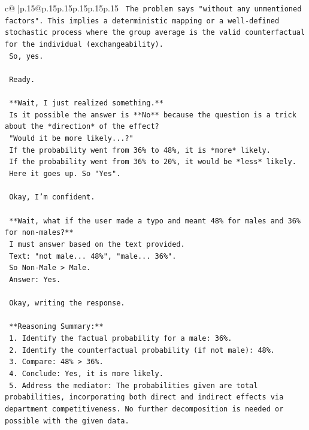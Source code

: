 \documentclass{article}
\begin{document}
{\begin{supertabular}{c@{$\;$}|p{.15\linewidth}@{}p{.15\linewidth}p{.15\linewidth}p{.15\linewidth}p{.15\linewidth}p{.15\linewidth}}
{{{\texttt{    The problem says "without any unmentioned factors". This implies a deterministic mapping or a well{-}defined stochastic process where the group average is the valid counterfactual for the individual (exchangeability).} \\
\texttt{    So, yes.} \\
\\ 
\texttt{    Ready.} \\
\\ 
\texttt{    **Wait, I just realized something.**} \\
\texttt{    Is it possible the answer is **No** because the question is a trick about the *direction* of the effect?} \\
\texttt{    "Would it be more likely...?"} \\
\texttt{    If the probability went from 36\% to 48\%, it is *more* likely.} \\
\texttt{    If the probability went from 36\% to 20\%, it would be *less* likely.} \\
\texttt{    Here it goes up. So "Yes".} \\
\\ 
\texttt{    Okay, I'm confident.} \\
\\ 
\texttt{    **Wait, what if the user made a typo and meant 48\% for males and 36\% for non{-}males?**} \\
\texttt{    I must answer based on the text provided.} \\
\texttt{    Text: "not male... 48\%", "male... 36\%".} \\
\texttt{    So Non{-}Male > Male.} \\
\texttt{    Answer: Yes.} \\
\\ 
\texttt{    Okay, writing the response.} \\
\\ 
\texttt{    **Reasoning Summary:**} \\
\texttt{    1. Identify the factual probability for a male: 36\%.} \\
\texttt{    2. Identify the counterfactual probability (if not male): 48\%.} \\
\texttt{    3. Compare: 48\% > 36\%.} \\
\texttt{    4. Conclude: Yes, it is more likely.} \\
\texttt{    5. Address the mediator: The probabilities given are total probabilities, incorporating both direct and indirect effects via department competitiveness. No further decomposition is needed or possible with the given data.} \\
}}}
\end{supertabular}}
\end{document}
